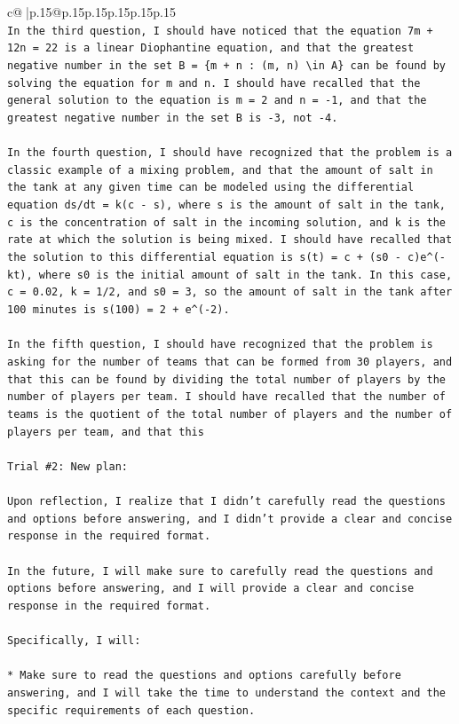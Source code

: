 \documentclass{article}
\begin{document}
{\begin{supertabular}{c@{$\;$}|p{.15\linewidth}@{}p{.15\linewidth}p{.15\linewidth}p{.15\linewidth}p{.15\linewidth}p{.15\linewidth}}
{{{\\ 
\texttt{In the third question, I should have noticed that the equation 7m + 12n = 22 is a linear Diophantine equation, and that the greatest negative number in the set B = \{m + n : (m, n) \textbackslash{}in A\} can be found by solving the equation for m and n. I should have recalled that the general solution to the equation is m = 2 and n = {-}1, and that the greatest negative number in the set B is {-}3, not {-}4.} \\
\\ 
\texttt{In the fourth question, I should have recognized that the problem is a classic example of a mixing problem, and that the amount of salt in the tank at any given time can be modeled using the differential equation ds/dt = k(c {-} s), where s is the amount of salt in the tank, c is the concentration of salt in the incoming solution, and k is the rate at which the solution is being mixed. I should have recalled that the solution to this differential equation is s(t) = c + (s0 {-} c)e\^{}({-}kt), where s0 is the initial amount of salt in the tank. In this case, c = 0.02, k = 1/2, and s0 = 3, so the amount of salt in the tank after 100 minutes is s(100) = 2 + e\^{}({-}2).} \\
\\ 
\texttt{In the fifth question, I should have recognized that the problem is asking for the number of teams that can be formed from 30 players, and that this can be found by dividing the total number of players by the number of players per team. I should have recalled that the number of teams is the quotient of the total number of players and the number of players per team, and that this} \\
\\ 
\texttt{Trial \#2: New plan: } \\
\\ 
\texttt{Upon reflection, I realize that I didn't carefully read the questions and options before answering, and I didn't provide a clear and concise response in the required format. } \\
\\ 
\texttt{In the future, I will make sure to carefully read the questions and options before answering, and I will provide a clear and concise response in the required format. } \\
\\ 
\texttt{Specifically, I will:} \\
\\ 
\texttt{* Make sure to read the questions and options carefully before answering, and I will take the time to understand the context and the specific requirements of each question.} \\
}}}
\end{supertabular}}
\end{document}

